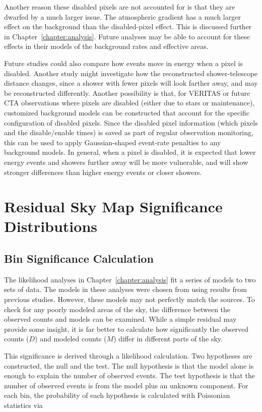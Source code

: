 Another reason these disabled pixels are not accounted for is that they are dwarfed by a much larger issue.
The atmospheric gradient has a much larger effect on the background than the disabled-pixel effect.
This is discussed further in Chapter~\ref{chapter:analysis}.
Future analyses may be able to account for these effects in their models of the background rates and effective areas.

Future studies could also compare how events move in energy when a pixel is disabled.
Another study might investigate how the reconstructed shower-telescope distance changes, since a shower with fewer pixels will look farther away, and may be reconstructed differently.
Another possibility is that, for VERITAS or future CTA observations where pixels are disabled (either due to stars or maintenance), customized background models can be constructed that account for the specific configuration of disabled pixels.
Since the disabled pixel information (which pixels and the disable/enable times) is saved as part of regular observation monitoring, this can be used to apply Gaussian-shaped event-rate penalties to any background models.
In general, when a pixel is disabled, it is expected that lower energy events and showers further away will be more vulnerable, and will show stronger differences than higher energy events or closer showers.



\chapter{Residual Sky Map Significance Distributions}\label{app:sigdist}

\section{Bin Significance Calculation}
The likelihood analyses in Chapter~\ref{chapter:analysis} fit a series of models to two sets of data.
The models in these analyses were chosen from using results from previous studies.
However, these models may not perfectly match the sources.
To check for any poorly modeled areas of the sky, the difference between the observed counts and models can be examined.
While a simple residual may provide some insight, it is far better to calculate how significantly the observed counts ($D$) and modeled counts ($M$) differ in different parts of the sky.

This significance is derived through a likelihood calculation.
Two hypotheses are constructed, the null and the test.
The null hypothesis is that the model alone is enough to explain the number of observed events.
The test hypothesis is that the number of observed events is from the model plus an unknown component.
For each bin, the probability of each hypothesis is calculated with Poissonian statistics via

